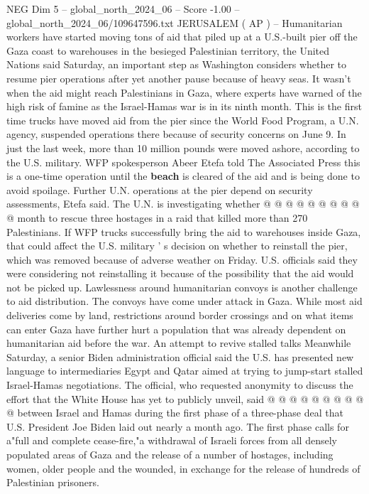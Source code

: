 \begin{textsample}{NEG Dim 5 – global\_north\_2024\_06 – Score -1.00 – global\_north\_2024\_06/109647596.txt}  \label{ex:f5_neg_087}
JERUSALEM ( AP ) -- Humanitarian workers have started moving tons of aid that piled up at a U.S.-built pier off the Gaza coast to warehouses in the besieged Palestinian territory, the United Nations said Saturday, an important step as Washington considers whether to resume pier operations after yet another pause because of heavy seas.
It wasn't when the aid might reach Palestinians in Gaza, where experts have warned of the high risk of famine as the Israel-Hamas war is in its ninth month.
This is the first time trucks have moved aid from the pier since the World Food Program, a U.N. agency, suspended operations there because of security concerns on June 9.
In just the last week, more than 10 million pounds were moved ashore, according to the U.S. military.
WFP spokesperson Abeer Etefa told The Associated Press this is a one-time operation until the \textbf{beach} is cleared of the aid and is being done to avoid spoilage.
Further U.N. operations at the pier depend on security assessments, Etefa said.
The U.N. is investigating whether @ @ @ @ @ @ @ @ @ @ month to rescue three hostages in a raid that killed more than 270 Palestinians.
If WFP trucks successfully bring the aid to warehouses inside Gaza, that could affect the U.S. military ' s decision on whether to reinstall the pier, which was removed because of adverse weather on Friday.
U.S. officials said they were considering not reinstalling it because of the possibility that the aid would not be picked up.
Lawlessness around humanitarian convoys is another challenge to aid distribution.
The convoys have come under attack in Gaza.
While most aid deliveries come by land, restrictions around border crossings and on what items can enter Gaza have further hurt a population that was already dependent on humanitarian aid before the war.
An attempt to revive stalled talks Meanwhile Saturday, a senior Biden administration official said the U.S. has presented new language to intermediaries Egypt and Qatar aimed at trying to jump-start stalled Israel-Hamas negotiations.
The official, who requested anonymity to discuss the effort that the White House has yet to publicly unveil, said @ @ @ @ @ @ @ @ @ @ between Israel and Hamas during the first phase of a three-phase deal that U.S.
President Joe Biden laid out nearly a month ago.
The first phase calls for a"full and complete cease-fire,"a withdrawal of Israeli forces from all densely populated areas of Gaza and the release of a number of hostages, including women, older people and the wounded, in exchange for the release of hundreds of Palestinian prisoners.

\end{textsample}
